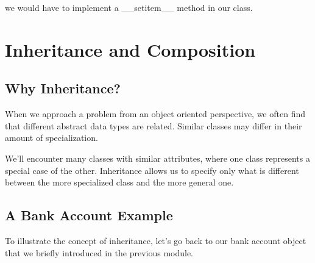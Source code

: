 \documentclass{article}
\begin{document}
we would have to implement a {\_}{\_}setitem{\_}{\_} method in our class.

\section{Inheritance and Composition}
\subsection{Why Inheritance?}

When we approach a problem from an object oriented perspective,  we often find that different abstract data types are related.  Similar classes may differ in their amount of specialization. 

We'll encounter many classes with similar attributes, where one class represents a special case of the other.  Inheritance allows us to specify only what is different between the more specialized class and the more general one.  

\subsection{A Bank Account Example}

To illustrate the concept of inheritance, let’s go back to our bank account object that we briefly introduced in the previous module. 
\end{document}
